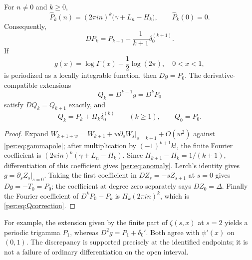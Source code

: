 \begin{theorem}
\label{per:thm:contact}
For $n\ne0$ and $k\ge0$,
\begin{equation}\label{per:eq:Pfourier}
 \widehat P_k(n)=(2\pi i n)^k\bigl(\gamma+L_n-H_k\bigr),
 \qquad \widehat P_k(0)=0.
\end{equation}
Consequently,
\begin{equation}\label{per:eq:anomaly}
 DP_k=P_{k+1}+\frac{1}{k+1}\delta_0^{(k+1)}.
\end{equation}
If
\[
 g(x)=\log\Gamma(x)-\frac12\log(2\pi),\quad 0<x<1,
\]
is periodized as a locally integrable function, then $Dg=P_0$. The
derivative-compatible extensions
\begin{equation}\label{per:eq:Q}
 Q_k=D^{k+1}g=D^kP_0
\end{equation}
satisfy $DQ_k=Q_{k+1}$ exactly, and
\begin{equation}\label{per:eq:Qcorrection}
 Q_k=P_k+H_k\delta_0^{(k)}\qquad(k\ge1),\qquad Q_0=P_0.
\end{equation}
\end{theorem}

\begin{proof}
Expand $W_{k+1+w}=W_{k+1}+w\partial_sW_s|_{s=k+1}+O(w^2)$
against \eqref{per:eq:gammapole}; after multiplication by
$(-1)^{k+1}k!$, the finite Fourier coefficient is
$(2\pi i n)^k(\gamma+L_n-H_k)$.
Since $H_{k+1}-H_k=1/(k+1)$, differentiation of this coefficient gives
\eqref{per:eq:anomaly}. Lerch's identity gives $g=\partial_sZ_s|_{s=0}$.
Taking the first coefficient in $DZ_s=-sZ_{s+1}$ at $s=0$ gives
$Dg=-T_0=P_0$; the coefficient at degree zero separately says
$DZ_0=\Delta$. Finally the Fourier coefficient of $D^kP_0-P_k$ is
$H_k(2\pi i n)^k$, which is \eqref{per:eq:Qcorrection}.
\end{proof}

For example, the extension given by the finite part of
$\zeta(s,x)$ at $s=2$ yields a periodic trigamma $P_1$, whereas
$D^2g=P_1+\delta_0'$. Both agree with $\psi'(x)$ on $(0,1)$.
The discrepancy is supported precisely at the identified endpoints;
it is not a failure of ordinary differentiation on the open interval.

